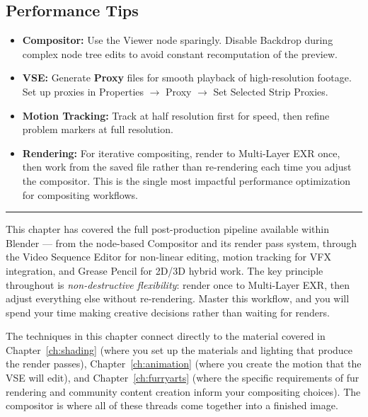 \subsection{Performance Tips}

\begin{itemize}[leftmargin=2em]
  \item \textbf{Compositor:} Use the Viewer node sparingly. Disable Backdrop during complex node tree edits to avoid constant recomputation of the preview.
  \item \textbf{VSE:} Generate \textbf{Proxy} files for smooth playback of high-resolution footage. Set up proxies in Properties $\rightarrow$ Proxy $\rightarrow$ Set Selected Strip Proxies.
  \item \textbf{Motion Tracking:} Track at half resolution first for speed, then refine problem markers at full resolution.
  \item \textbf{Rendering:} For iterative compositing, render to Multi-Layer EXR once, then work from the saved file rather than re-rendering each time you adjust the compositor. This is the single most impactful performance optimization for compositing workflows.
\end{itemize}

\vspace{1em}
\begin{center}
\textcolor{bordergray}{\rule{0.5\textwidth}{0.5pt}}
\end{center}
\vspace{1em}

This chapter has covered the full post-production pipeline available within Blender --- from the node-based Compositor and its render pass system, through the Video Sequence Editor for non-linear editing, motion tracking for VFX integration, and Grease Pencil for 2D/3D hybrid work. The key principle throughout is \textit{non-destructive flexibility}: render once to Multi-Layer EXR, then adjust everything else without re-rendering. Master this workflow, and you will spend your time making creative decisions rather than waiting for renders.

The techniques in this chapter connect directly to the material covered in Chapter~\ref{ch:shading} (where you set up the materials and lighting that produce the render passes), Chapter~\ref{ch:animation} (where you create the motion that the VSE will edit), and Chapter~\ref{ch:furryarts} (where the specific requirements of fur rendering and community content creation inform your compositing choices). The compositor is where all of these threads come together into a finished image.
